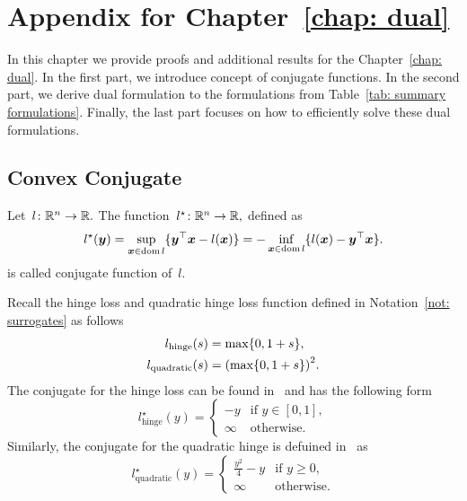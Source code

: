 \chapter{Appendix for Chapter~\ref{chap: dual}}

In this chapter we provide proofs and additional results for the Chapter~\ref{chap: dual}. In the first part, we introduce concept of conjugate functions. In the second part, we derive dual formulation to the formulations from Table~\ref{tab: summary formulations}. Finally, the last part focuses on how to efficiently solve these dual formulations.

\section{Convex Conjugate}
\begin{definition}\label{def: conjugate}
  Let~$l \colon \mathbb{R}^n \to \mathbb{R}.$ The function~$l^{\star} \colon \mathbb{R}^n \to \mathbb{R},$ defined as
  \begin{equation*}
    l^{\star} (\bm{y})
      =  \sup_{\bm{x} \in \operatorname*{dom} l} \{\bm{y}^{\top}\bm{x} - l(\bm{x})\}
      = -\inf_{\bm{x} \in \operatorname*{dom} l} \{l(\bm{x}) - \bm{y}^{\top}\bm{x}\}.
  \end{equation*}
  is called conjugate function of~$l.$
\end{definition}
Recall the hinge loss and quadratic hinge loss function defined in Notation~\ref{not: surrogates} as follows
\begin{equation*}
  \begin{aligned}
    l_{\text{hinge}}(s) & = \max\Brac[c]{0, 1 + s}, \\
    l_{\text{quadratic}}(s) & = \Brac{\max\Brac[c]{0, 1 + s}}^2.\\
  \end{aligned}
\end{equation*}
The conjugate for the hinge loss can be found in~\cite{shnlev2014accelerated} and has the following form
\begin{equation}\label{eq: conjugate hinge}
  l_{\text{hinge}}^{\star}(y) =
  \begin{cases}
    -y & \text{if } y \in [0, 1], \\
    \infty & \text{otherwise.}
  \end{cases}  
\end{equation}
Similarly, the conjugate for the quadratic hinge is defuined in~\cite{kanamori2013conjugate} as
\begin{equation}\label{eq: conjugate quadratic hinge}
  l_{\text{quadratic}}^{\star}(y) =
  \begin{cases}
    \frac{y^2}{4} - y & \text{if } y \geq 0, \\
    \infty & \text{otherwise.}
  \end{cases}
\end{equation}


